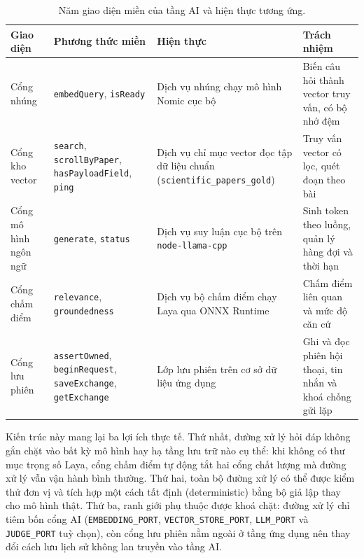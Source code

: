 \begin{table}[htbp]
    \centering
    \caption{Năm giao diện miền của tầng AI và hiện thực tương ứng.}
    \label{tab:nam-giao-dien-ai}
    \footnotesize
    \begin{tabularx}{\textwidth}{@{}>{\raggedright\arraybackslash}p{2.6cm}>{\raggedright\arraybackslash}p{3.9cm}>{\raggedright\arraybackslash}p{3.7cm}>{\raggedright\arraybackslash}X@{}}
        \toprule
        \textbf{Giao diện} & \textbf{Phương thức miền} & \textbf{Hiện thực} & \textbf{Trách nhiệm} \\
        \midrule
        Cổng nhúng & \texttt{embedQuery}, \texttt{isReady} & Dịch vụ nhúng chạy mô hình Nomic cục bộ & Biến câu hỏi thành vector truy vấn, có bộ nhớ đệm \\
        Cổng kho vector & \texttt{search}, \texttt{scrollByPaper}, \texttt{hasPayloadField}, \texttt{ping} & Dịch vụ chỉ mục vector đọc tập dữ liệu chuẩn (\texttt{scientific\_\allowbreak papers\_gold}) & Truy vấn vector có lọc, quét đoạn theo bài \\
        Cổng mô hình ngôn ngữ & \texttt{generate}, \texttt{status} & Dịch vụ suy luận cục bộ trên \texttt{node-llama-cpp} & Sinh token theo luồng, quản lý hàng đợi và thời hạn \\
        Cổng chấm điểm & \texttt{relevance}, \texttt{groundedness} & Dịch vụ bộ chấm điểm chạy Laya qua ONNX Runtime & Chấm điểm liên quan và mức độ căn cứ \\
        Cổng lưu phiên & \texttt{assertOwned}, \texttt{beginRequest}, \texttt{saveExchange}, \texttt{getExchange} & Lớp lưu phiên trên cơ sở dữ liệu ứng dụng & Ghi và đọc phiên hội thoại, tin nhắn và khoá chống gửi lặp \\
        \bottomrule
    \end{tabularx}
\end{table}

Kiến trúc này mang lại ba lợi ích thực tế. Thứ nhất, đường xử lý hỏi đáp không gắn chặt vào bất kỳ mô hình hay hạ tầng lưu trữ nào cụ thể: khi không có thư mục trọng số Laya, cổng chấm điểm tự động tắt hai cổng chất lượng mà đường xử lý vẫn vận hành bình thường. Thứ hai, toàn bộ đường xử lý có thể được kiểm thử đơn vị và tích hợp một cách tất định (deterministic) bằng bộ giả lập thay cho mô hình thật. Thứ ba, ranh giới phụ thuộc được khoá chặt: đường xử lý chỉ tiêm bốn cổng AI (\texttt{EMBEDDING\_PORT}, \texttt{VECTOR\_STORE\_PORT}, \texttt{LLM\_PORT} và \texttt{JUDGE\_PORT} tuỳ chọn), còn cổng lưu phiên nằm ngoài ở tầng ứng dụng nên thay đổi cách lưu lịch sử không lan truyền vào tầng AI.

